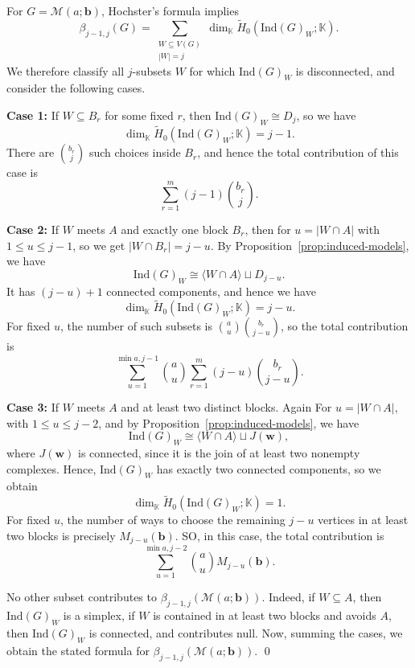 \documentclass[10pt,a4paper]{amsart}
\newcommand{\MM}{\mathcal{M}}
\newcommand{\bk}[1]{\mathbf{#1}}
\newcommand{\ind}{\mathrm{Ind}}
\newcommand{\kk}{\mathbb{K}}
\renewenvironment{proof}{{\bf \noindent Proof.}}{\qed}
\newcommand{\wt}{\widetilde}
\begin{document}
	\begin{proof}
		For $G=\MM(a;\bk{b})$, Hochster's formula implies
		$$
		\beta_{j-1,j}(G)=\sum_{\substack{W\subseteq V(G)\\ |W|=j}}
		\dim_{\kk}\wt H_0(\ind(G)_W;\kk).
		$$
		We therefore classify all $j$-subsets $W$ for which $\ind(G)_W$ is disconnected, and consider the following cases.
		
		\smallskip
		
		\noindent\textbf{Case 1:} If $W\subseteq B_r$ for some fixed $r$, then $\ind(G)_W\cong D_j$, so we have
		$$
		\dim_{\kk}\wt H_0(\ind(G)_W;\kk)=j-1.
		$$
		There are $\binom{b_r}{j}$ such choices inside $B_r$, and hence the total contribution of this case is
		$$
		\sum_{r=1}^m (j-1)\binom{b_r}{j}.
		$$
		
		\smallskip
		
		\noindent\textbf{Case 2:} If $W$ meets $A$ and exactly one block $B_r$, then for $u=|W\cap A|$ with $1\leq u\leq j-1$, so we get $|W\cap B_r|=j-u$. By Proposition~\ref{prop:induced-models}, we have
		$$
		\ind(G)_W\cong \langle W\cap A\rangle \sqcup D_{j-u}.
		$$
		It has $(j-u)+1$ connected components, and hence we have
		$$
		\dim_{\kk}\wt H_0(\ind(G)_W;\kk)=j-u.
		$$
		For fixed $u$, the number of such subsets is $\binom{a}{u}\binom{b_r}{j-u}$, so the total contribution is
		$$
		\sum_{u=1}^{\min{a,j-1}}
		\binom{a}{u}
		\sum_{r=1}^m (j-u)\binom{b_r}{j-u}.
		$$
		
		\smallskip
		
		\noindent\textbf{Case 3:} If $W$ meets $A$ and at least two distinct blocks. Again For $u=|W\cap A|$, with $1\leq u\leq j-2$, and by Proposition~\ref{prop:induced-models}, we have
		$$
		\ind(G)_W\cong \langle W\cap A\rangle \sqcup J(\bk{w}),
		$$
		where $J(\bk{w})$ is connected, since it is the join of at least two nonempty complexes. Hence, $\ind(G)_W$ has exactly two connected components, so we obtain
		$$
		\dim_{\kk}\wt H_0(\ind(G)_W;\kk)=1.
		$$
		For fixed $u$, the number of ways to choose the remaining $j-u$ vertices in at least two blocks is precisely $M_{j-u}(\bk{b})$. SO, in this  case, the total  contribution is
		$$
		\sum_{u=1}^{\min{a,j-2}}
		\binom{a}{u}M_{j-u}(\bk{b}).
		$$
		
		\smallskip
		 No other subset contributes to $\beta_{j-1,j}(\MM(a;\bk{b}))$. Indeed, if $W\subseteq A$, then $\ind(G)_W$ is a simplex, if $W$ is contained in at least two blocks and avoids $A$, then $\ind(G)_W$ is connected, and contributes null. Now, summing the cases, we obtain the stated formula for $\beta_{j-1,j}(\MM(a;\bk{b})).$
	\end{proof}
\end{document}
